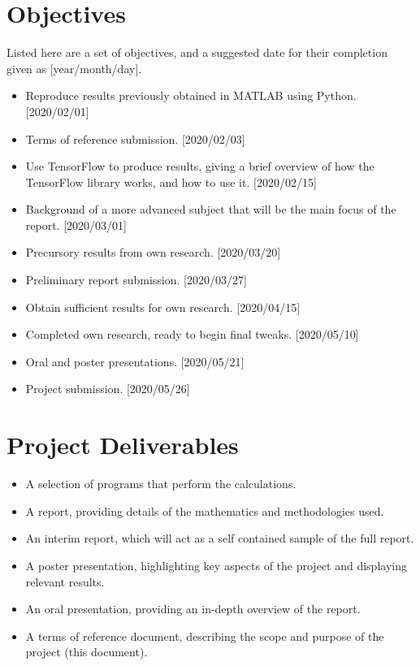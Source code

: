 \section*{Objectives}
Listed here are a set of objectives, and a suggested date for their completion\\
given as [year/month/day].
\begin{itemize}
    \item Reproduce results previously obtained in MATLAB using Python.
        [2020/02/01]

    \item Terms of reference submission. [2020/02/03]

    \item Use TensorFlow to produce results, giving a brief overview of how the
        TensorFlow library works, and how to use it. [2020/02/15]

    \item Background of a more advanced subject that will be the main focus of
        the report. [2020/03/01]

    \item Precursory results from own research. [2020/03/20]

    \item Preliminary report submission. [2020/03/27]

    \item Obtain sufficient results for own research. [2020/04/15]

    \item Completed own research, ready to begin final tweaks. [2020/05/10]

    \item Oral and poster presentations. [2020/05/21]

    \item Project submission. [2020/05/26]
\end{itemize}

\section*{Project Deliverables}
\begin{itemize}
    \item A selection of programs that perform the calculations.

    \item A report, providing details of the mathematics and methodologies used.

    \item An interim report, which will act as a self contained sample of the
        full report.

    \item A poster presentation, highlighting key aspects of the project and
        displaying relevant results.

    \item An oral presentation, providing an in-depth overview of the report.

    \item A terms of reference document, describing the scope and purpose of the
        project (this document).
\end{itemize}

